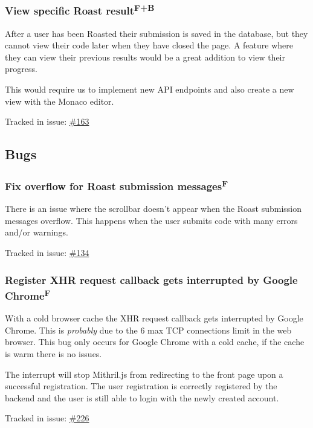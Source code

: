 \documentclass[12pt,a4paper]{report}
\begin{document}
\subsubsection{View specific Roast result\texorpdfstring{\textsuperscript{F+B}}{}}
After a user has been Roasted their submission is saved in the database, but they cannot view their code later when they have closed the page. A feature where they can view their previous results would be a great addition to view their progress.

This would require us to implement new API endpoints and also create a new view with the Monaco editor.

Tracked in issue: \href{https://github.com/LuleaUniversityOfTechnology/2018-project-roaster/issues/163}{\#163}

\subsection*{Bugs}
\subsubsection{Fix overflow for Roast submission messages\texorpdfstring{\textsuperscript{F}}{}}
There is an issue where the scrollbar doesn't appear when the Roast submission messages overflow. This happens when the user submits code with many errors and/or warnings.

Tracked in issue: \href{https://github.com/LuleaUniversityOfTechnology/2018-project-roaster/issues/134}{\#134}

\subsubsection{Register XHR request callback gets interrupted by Google  Chrome\texorpdfstring{\textsuperscript{F}}{}}
With a cold browser cache the XHR request callback gets interrupted by Google Chrome. This is \textit{probably} due to the 6 max TCP connections limit in the web browser. This bug only occurs for Google Chrome with a cold cache, if the cache is warm there is no issues.

The interrupt will stop Mithril.js from redirecting to the front page upon a successful registration. The user registration is correctly registered by the backend and the user is still able to login with the newly created account.

Tracked in issue: \href{https://github.com/LuleaUniversityOfTechnology/2018-project-roaster/issues/226}{\#226}
\end{document}
